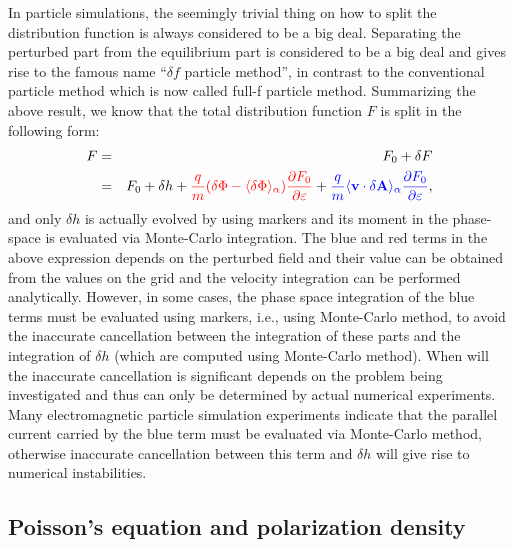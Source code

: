\documentclass{article}
\newcommand{\tmcolor}[2]{{\color{#1}{#2}}}
\begin{document}
In particle simulations, the seemingly trivial thing on how to split the
distribution function is always considered to be a big deal. Separating the
perturbed part from the equilibrium part is considered to be a big deal and
gives rise to the famous name ``$\delta f$ particle method'', in contrast to
the conventional particle method which is now called full-f particle method.
Summarizing the above result, we know that the total distribution function $F$
is split in the following form:
\begin{eqnarray}
  F & = & F_0 + \delta F \nonumber\\
  & = & F_0 + \delta h + \tmcolor{red}{\frac{q}{m} (\delta \Phi - \langle
  \delta \Phi \rangle_{\alpha}) \frac{\partial F_0}{\partial \varepsilon}} +
  \tmcolor{blue}{\frac{q}{m} \langle \mathbf{v} \cdot \delta \mathbf{A}
  \rangle_{\alpha} \frac{\partial F_0}{\partial \varepsilon}}, 
\end{eqnarray}
and only $\delta h$ is actually evolved by using markers and its moment in the
phase-space is evaluated via Monte-Carlo integration. The blue and red terms
in the above expression depends on the perturbed field and their value can be
obtained from the values on the grid and the velocity integration can be
performed analytically. However, in some cases, the phase space integration of
the blue terms must be evaluated using markers, i.e., using Monte-Carlo
method, to avoid the inaccurate cancellation between the integration of these
parts and the integration of $\delta h$ (which are computed using Monte-Carlo
method). When will the inaccurate cancellation is significant depends on the
problem being investigated and thus can only be determined by actual numerical
experiments. Many electromagnetic particle simulation experiments indicate
that the parallel current carried by the blue term must be evaluated via
Monte-Carlo method, otherwise inaccurate cancellation between this term and
$\delta h$ will give rise to numerical instabilities.

\subsection{Poisson's equation and polarization density}\label{19-1-4-1}
\end{document}
